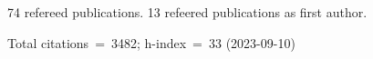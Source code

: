 74 refereed publications. 13 refeered publications as first author.

Total citations~=~3482; h-index~=~33 (2023-09-10)